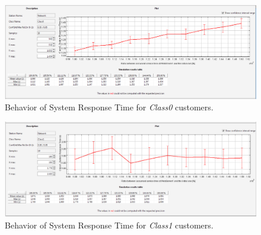 \begin{figure}[htb]
    \begin{center}
        \includegraphics[scale=.36]{img/jsimg/EX2_SRT_Class0.eps}
    \end{center}
    \caption{Behavior of System Response Time for \emph{Class0} customers.}
    \label{fig:respcl0}
\end{figure}

\begin{figure}[htb]
    \begin{center}
        \includegraphics[scale=.35]{img/jsimg/EX2_SRT_Class1.eps}
    \end{center}
    \caption{Behavior of System Response Time for \emph{Class1} customers.}
    \label{fig:respcl1}
\end{figure}
